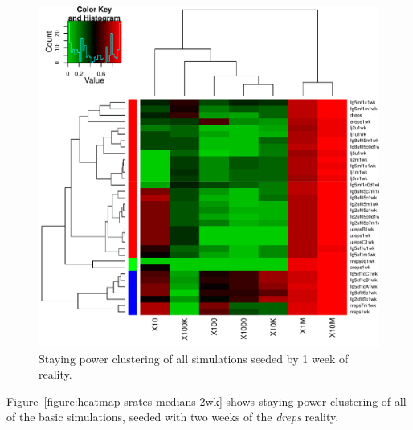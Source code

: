 \documentclass[10pt,oneside]{memoir}
\begin{document}
\begin{figure}
\begin{center}
    \includegraphics{figures/heatmap-srates-medians-1wk}
    \caption{Staying power clustering of all simulations seeded by 1 week of reality.}
    \label{figure:heatmap-srates-medians-1wk}
\end{center}
\end{figure}
Figure~\ref{figure:heatmap-srates-medians-2wk} shows staying power clustering of all of the basic simulations, seeded with two weeks of the {\itshape dreps} reality.
\end{document}
